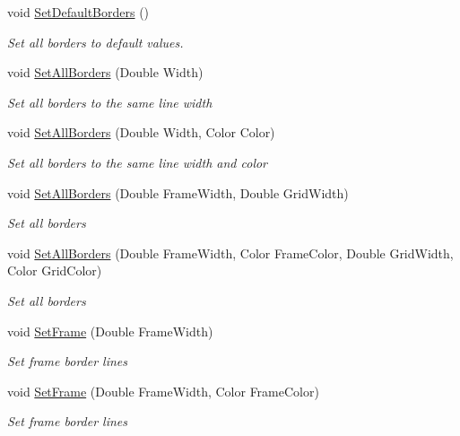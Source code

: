 \begin{DoxyCompactItemize}
void \hyperlink{class_pdf_file_writer_1_1_pdf_table_border_ad5b3c50bd315ad6678f45ca84ede71eb}{Set\+Default\+Borders} ()
\begin{DoxyCompactList}\small\item\em Set all borders to default values. \end{DoxyCompactList}\item 
void \hyperlink{class_pdf_file_writer_1_1_pdf_table_border_a19e8f1c65dc1f605db1bd0b10aa35b64}{Set\+All\+Borders} (Double Width)
\begin{DoxyCompactList}\small\item\em Set all borders to the same line width \end{DoxyCompactList}\item 
void \hyperlink{class_pdf_file_writer_1_1_pdf_table_border_a2c0b42b7c823e4bb3ad38a128524690e}{Set\+All\+Borders} (Double Width, Color Color)
\begin{DoxyCompactList}\small\item\em Set all borders to the same line width and color \end{DoxyCompactList}\item 
void \hyperlink{class_pdf_file_writer_1_1_pdf_table_border_a772e6e7026f29d68293b3188c7188298}{Set\+All\+Borders} (Double Frame\+Width, Double Grid\+Width)
\begin{DoxyCompactList}\small\item\em Set all borders \end{DoxyCompactList}\item 
void \hyperlink{class_pdf_file_writer_1_1_pdf_table_border_a4af31214d4dff503791869a2d3e36127}{Set\+All\+Borders} (Double Frame\+Width, Color Frame\+Color, Double Grid\+Width, Color Grid\+Color)
\begin{DoxyCompactList}\small\item\em Set all borders \end{DoxyCompactList}\item 
void \hyperlink{class_pdf_file_writer_1_1_pdf_table_border_a346048cebdad84b544e7a67c459d742e}{Set\+Frame} (Double Frame\+Width)
\begin{DoxyCompactList}\small\item\em Set frame border lines \end{DoxyCompactList}\item 
void \hyperlink{class_pdf_file_writer_1_1_pdf_table_border_aceff5e44b23b5369a62350dee26c67d3}{Set\+Frame} (Double Frame\+Width, Color Frame\+Color)
\begin{DoxyCompactList}\small\item\em Set frame border lines \end{DoxyCompactList}\end{DoxyCompactItemize}
